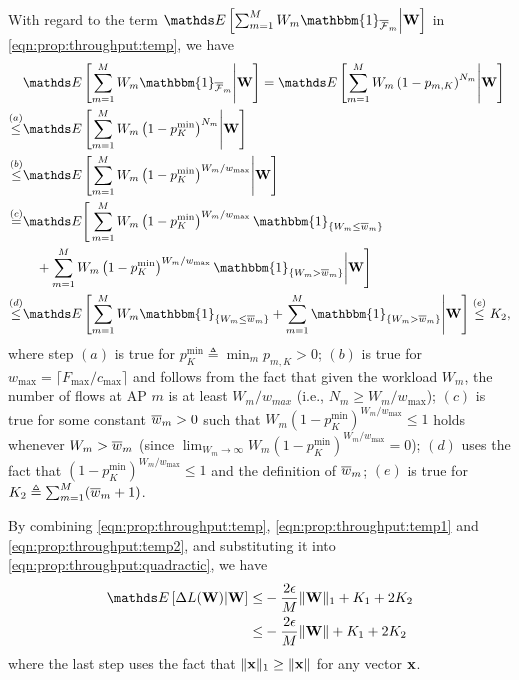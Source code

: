 \documentclass[10pt, conference, letterpaper]{IEEEtran} %
\begin{document}
With regard to the term $\bE\left[\sum_{m=1}^{M}W_m\mathbbm{1}_{\ol{\mc{F}}_m}\middle|\mb{W}\right]$ in \eqref{eqn:prop:throughput:temp}, we have
\begin{align}
\label{eqn:prop:throughput:temp2}
&\bE\left[\sum_{m=1}^{M}W_m\mathbbm{1}_{\ol{\mc{F}}_m}\middle|\mb{W}\right]
=\bE\left[\sum_{m=1}^{M}W_m\left(1-p_{m,K}\right)^{N_m}\middle|\mb{W}\right] \nonumber\\
\stackrel{(a)}{\leq}&\bE\left[\sum_{m=1}^{M}W_m\left(1-p_{K}^{\min}\right)^{N_m}\middle|\mb{W}\right] \nonumber\\
\stackrel{(b)}{\leq}&\bE\left[\sum_{m=1}^{M}W_m\left(1-p_{K}^{\min}\right)^{W_{m}/w_{\max}}\middle|\mb{W}\right]\nonumber\\
\stackrel{(c)}{=}&\bE\Bigg[\sum_{m=1}^{M}W_m\left(1-p_{K}^{\min}\right)^{W_{m}/w_{\max}}\mathbbm{1}_{\{W_m\leq\ol{w}_m\}}\nonumber\\
&\quad+\sum_{m=1}^{M}W_m\left(1-p_{K}^{\min}\right)^{W_{m}/w_{\max}}\mathbbm{1}_{\{W_m>\ol{w}_m\}}\bigg|\mb{W}\Bigg] \nonumber\\
\stackrel{(d)}{\leq}&\bE\left[\sum_{m=1}^{M}W_m\mathbbm{1}_{\{W_m\leq\ol{w}_m\}}+\sum_{m=1}^{M}\mathbbm{1}_{\{W_m>\ol{w}_m\}}\middle|\mb{W}\right]\stackrel{(e)}{\leq} K_2,
\end{align}
where step $(a)$ is true for $p_K^{\min}\triangleq\min_{m}p_{m,K}>0$; $(b)$ is true for $w_{\max}=\lceil F_{\max}/c_{\max}\rceil$ and follows from the fact that given the workload $W_m$, the number of flows at AP $m$ is at least $W_m/w_{max}$ (i.e., $N_m\geq W_m/w_{\max}$); $(c)$ is true for some constant $\overline{w}_m>0$ such that $W_m(1-p_{K}^{\min})^{W_m/w_{\max}}\leq1$ holds whenever $W_m>\overline{w}_m$ (since $\lim_{W_m\rightarrow\infty}W_m(1-p_{K}^{\min})^{W_m/w_{\max}}=0$); $(d)$ uses the fact that $(1-p_{K}^{\min})^{W_m/w_{\max}}\leq1$ and the definition of $\overline{w}_m$; $(e)$ is true for $K_2\triangleq\sum_{m=1}^{M}(\overline{w}_m+1)$.

By combining \eqref{eqn:prop:throughput:temp}, \eqref{eqn:prop:throughput:temp1} and \eqref{eqn:prop:throughput:temp2}, and substituting it into \eqref{eqn:prop:throughput:quadractic}, we have 
\begin{align}
\label{eqn:prop:throughput:quadractic:final}
\bE\left[\Delta L(\mb{W})\middle|\mb{W}\right]\leq&-\frac{2\epsilon}{M}\|\mb{W}\|_{1}+K_1+2K_2\nonumber\\
\leq&-\frac{2\epsilon}{M}\|\mb{W}\|+K_1+2K_2
\end{align}
where the last step uses the fact that $\|\mathbf{x}\|_1\geq\|\mathbf{x}\|$ for any vector $\mathbf{x}$.
\end{document}
